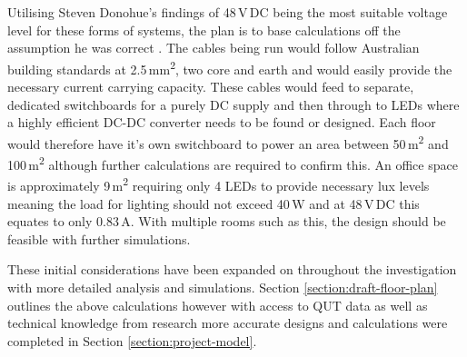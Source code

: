 Utilising Steven Donohue's findings of 48\,V\,DC being the most suitable voltage level for these forms  of systems, the plan is to base calculations off the assumption he was correct \cite{Donohue2014}. The cables being run would follow Australian building standards at 2.5\,\si{mm^2}, two core and earth and would easily provide the necessary current carrying capacity. These cables would feed to separate, dedicated switchboards for a purely DC supply and then through to LEDs where a highly efficient DC-DC converter needs to be found or designed. Each floor would therefore have it's own switchboard to power an area between 50\,\si{m^2} and 100\,\si{m^2} although further calculations are required to confirm this. An office space is approximately 9\,\si{m^2} requiring only 4 LEDs to provide necessary lux levels meaning the load for lighting should not exceed 40\,W and at 48\,V\,DC this equates to only 0.83\,A. With multiple rooms such as this, the design should be feasible with further simulations.
\newline

These initial considerations have been expanded on throughout the investigation with more detailed analysis and simulations. Section \ref{section:draft-floor-plan} outlines the above calculations however with access to QUT data as well as technical knowledge from research more accurate designs and calculations were completed in Section \ref{section:project-model}.    

\newpage